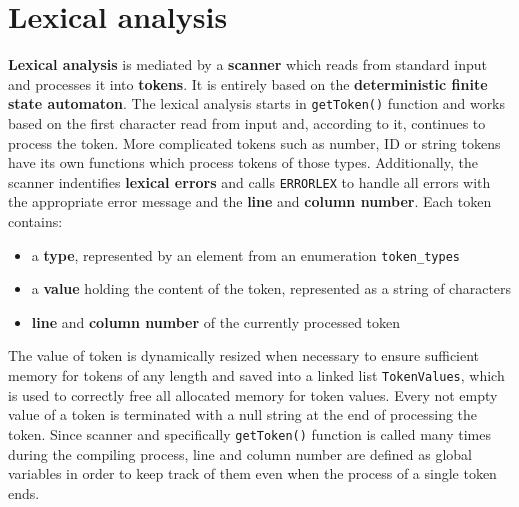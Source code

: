 \documentclass[a4paper, 11pt]{article}
\begin{document}
\section{Lexical analysis}\label{sec:LEX}
\textbf{Lexical analysis} is mediated by a \textbf{scanner} which reads from standard input and processes it into \textbf{tokens}.
It is entirely based on the \textbf{deterministic finite state automaton}. The lexical analysis starts in \verb|getToken()| function and works based on the 
first character read from input and, according to it, continues to process the token. 
More complicated tokens such as number, ID or string tokens have its own functions which process tokens of those types. Additionally, the scanner indentifies \textbf{lexical errors} and calls \verb|ERRORLEX|
to handle all errors with the appropriate error message and the \textbf{line} and \textbf{column number}. 
Each token contains: 
\begin{itemize}
\item a \textbf{type}, represented by an element from an enumeration \verb|token_types|
\item a \textbf{value} holding the content of the token, represented as a string of characters
\item \textbf{line} and \textbf{column number} of the currently processed token
\end{itemize}
The value of token is dynamically resized when necessary to ensure sufficient memory for tokens of any length and saved 
into a linked list \verb|TokenValues|, which is used to correctly free all allocated memory for token values. 
Every not empty value of a token is terminated with a null string at the end of processing the token. 
Since scanner and specifically \verb|getToken()| function is called many times during the compiling process, line and column 
number are defined as global variables in order to keep track of them even when the process of a single token ends. 
\end{document}
